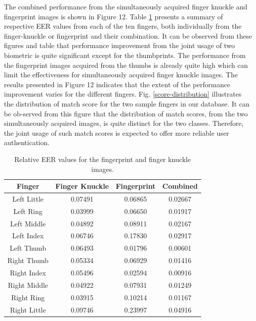 The combined performance from the simultaneously acquired finger knuckle and fingerprint images is shown in Figure 12. Table \ref{fusion-eer} presents a summary of respective EER values from each of the ten fingers, both individually from the finger-knuckle or fingerprint and their combination. It can be observed from these figures and table that performance improvement from the joint usage of two biometric is quite significant except for the thumbprints. The performance from the fingerprint images acquired from the thumbs is already quite high which can limit the effectiveness for simultaneously acquired finger knuckle images. The results presented in Figure 12 indicates that the extent of the performance improvement varies for the different fingers. Fig. \ref{score-distribution} illustrates the distribution of match score for the two sample fingers in our database. It can be ob-served from this figure that the distribution of match scores, from the two simultaneously acquired images, is quite distinct for the two classes. Therefore, the joint usage of such match scores is expected to offer more reliable user authentication.

\begin{table}[ht]
    \centering
    \caption{Relative EER values for the fingerprint and finger knuckle images.}
    \begin{tabular}{cccc}
    \hline
    Finger       & Finger Knuckle & Fingerprint & Combined \\ \hline
    Left Little  & 0.07491        & 0.06865     & 0.02667  \\
    Left Ring    & 0.03999        & 0.06650     & 0.01917  \\
    Left Middle  & 0.04892        & 0.08911     & 0.02167  \\
    Left Index   & 0.06746        & 0.17830     & 0.02917  \\
    Left Thumb   & 0.06493        & 0.01796     & 0.00601  \\
    Right Thumb  & 0.05334        & 0.06929     & 0.01416  \\
    Right Index  & 0.05496        & 0.02594     & 0.00916  \\
    Right Middle & 0.04922        & 0.07931     & 0.01249  \\
    Right Ring   & 0.03915        & 0.10214     & 0.01167  \\
    Right Little & 0.09746        & 0.23997     & 0.04916  \\ \hline
    \end{tabular}
    \label{fusion-eer}
\end{table}


